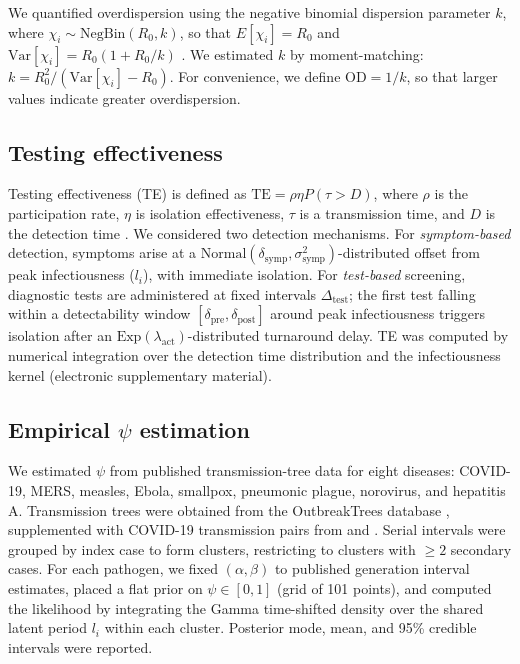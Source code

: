 \documentclass[10pt]{article}
\begin{document}
We quantified overdispersion using the negative binomial dispersion parameter $k$, where $\chi_i \sim \text{NegBin}(R_0, k)$, so that $E[\chi_i] = R_0$ and $\text{Var}[\chi_i] = R_0(1 + R_0/k)$ \citep{lloyd-smith_superspreading_2005}. We estimated $k$ by moment-matching: $k = R_0^2 / (\text{Var}[\chi_i] - R_0)$. For convenience, we define $\text{OD} = 1/k$, so that larger values indicate greater overdispersion.

\subsection{Testing effectiveness}

Testing effectiveness (TE) is defined as $\text{TE} = \rho \eta P(\tau > D)$, where $\rho$ is the participation rate, $\eta$ is isolation effectiveness, $\tau$ is a transmission time, and $D$ is the detection time \citep{middleton_modeling_2024}. We considered two detection mechanisms. For \textit{symptom-based} detection, symptoms arise at a $\text{Normal}(\delta_\text{symp}, \sigma_\text{symp}^2)$-distributed offset from peak infectiousness ($l_i$), with immediate isolation. For \textit{test-based} screening, diagnostic tests are administered at fixed intervals $\Delta_\text{test}$; the first test falling within a detectability window $[\delta_\text{pre}, \delta_\text{post}]$ around peak infectiousness triggers isolation after an $\text{Exp}(\lambda_\text{act})$-distributed turnaround delay. TE was computed by numerical integration over the detection time distribution and the infectiousness kernel (electronic supplementary material).

\subsection{Empirical $\psi$ estimation}

We estimated $\psi$ from published transmission-tree data for eight diseases: COVID-19, MERS, measles, Ebola, smallpox, pneumonic plague, norovirus, and hepatitis A. Transmission trees were obtained from the OutbreakTrees database \citep{taube_outbreaktrees_2022}, supplemented with COVID-19 transmission pairs from \citet{ganyani_estimating_2020} and \citet{hart_generation_2022}. Serial intervals were grouped by index case to form clusters, restricting to clusters with $\geq 2$ secondary cases. For each pathogen, we fixed $(\alpha, \beta)$ to published generation interval estimates, placed a flat prior on $\psi \in [0,1]$ (grid of 101 points), and computed the likelihood by integrating the Gamma time-shifted density over the shared latent period $l_i$ within each cluster. Posterior mode, mean, and 95\% credible intervals were reported.
\end{document}
